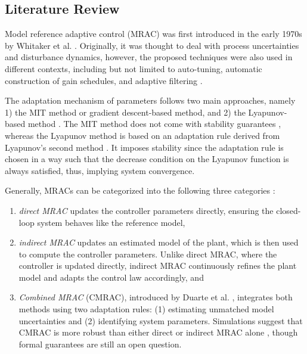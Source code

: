 \subsection{Literature Review}
\label{sec:related-work}
Model reference adaptive control (MRAC) was first introduced in the early 1970s by Whitaker et al. \cite{whitakerDesignModelReference1958}. Originally, it was thought to deal with process uncertainties and disturbance dynamics, however, the proposed techniques were also used in different contexts, including but not limited to auto-tuning, automatic construction of gain schedules, and adaptive filtering \cite{astromTheoryApplicationsAdaptive1983, astromHistoryAdaptiveControl2014}.

The adaptation mechanism of parameters follows two main approaches, namely 1) the MIT method or gradient descent-based method, and 2) the Lyapunov-based method \cite{astromAdaptiveControl2008}. The MIT method does not come with stability guarantees \cite{mareelsRevisitingMitRule1987}, whereas the Lyapunov method is based on an adaptation rule derived from Lyapunov's second method \cite{shackclothSynthesisModelReference1965}. It imposes stability since the adaptation rule is chosen in a way such that the decrease condition on the Lyapunov function is always satisfied, thus, implying system convergence.

Generally, MRACs can be categorized into the following three categories \cite{astromHistoryAdaptiveControl2014}:
\begin{enumerate}
    \item \textit{direct MRAC} updates the controller parameters directly, ensuring the closed-loop system behaves like the reference model,
    \item \textit{indirect MRAC} updates an estimated model of the plant, which is then used to compute the controller parameters. Unlike direct MRAC, where the controller is updated directly, indirect MRAC continuously refines the plant model and adapts the control law accordingly, and
    \item \textit{Combined MRAC} (CMRAC), introduced by Duarte et al. \cite{duarteCombinedDirectIndirect1989}, integrates both methods using two adaptation rules: (1) estimating unmatched model uncertainties and (2) identifying system parameters. Simulations suggest that CMRAC is more robust than either direct or indirect MRAC alone \cite{narendraRobustAdaptiveControl1988}, though formal guarantees are still an open question.
\end{enumerate}

